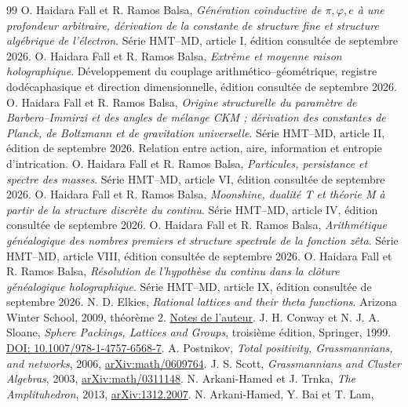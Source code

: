 \documentclass[a4paper,10pt]{article}
\theoremstyle{definition}\newtheorem{definition}[theorem]{Définition}
\theoremstyle{remark}\newtheorem{remark}[theorem]{Remarque}
\numberwithin{equation}{section}
\begin{document}
\begin{thebibliography}{99}
 O. Haidara Fall et R. Ramos Balsa,
\emph{Génération coinductive de \(\pi,\varphi,e\) à une profondeur arbitraire,
dérivation de la constante de structure fine et structure algébrique de
l’électron}. Série HMT--MD, article I, édition consultée de septembre 2026.
 O. Haidara Fall et R. Ramos Balsa,
\emph{Extrême et moyenne raison holographique}. Développement du couplage
arithmético--géométrique, registre dodécaphasique et direction dimensionnelle,
édition consultée de septembre 2026.
 O. Haidara Fall et R. Ramos Balsa,
\emph{Origine structurelle du paramètre de Barbero--Immirzi et des
angles de mélange CKM ; dérivation des constantes de Planck, de Boltzmann
et de gravitation universelle}. Série HMT--MD, article II, édition de
septembre 2026. Relation entre action, aire, information et entropie
d’intrication.
 O. Haidara Fall et R. Ramos Balsa,
\emph{Particules, persistance et spectre des masses}. Série HMT--MD, article VI,
édition consultée de septembre 2026.
 O. Haidara Fall et R. Ramos Balsa,
\emph{Moonshine, dualité T et théorie M à partir de la structure discrète du
continu}. Série HMT--MD, article IV, édition consultée de septembre 2026.
 O. Haidara Fall et R. Ramos Balsa,
\emph{Arithmétique généalogique des nombres premiers et structure spectrale
de la fonction zêta}. Série HMT--MD, article VIII, édition consultée de septembre 2026.
 O. Haidara Fall et R. Ramos Balsa,
\emph{Résolution de l’hypothèse du continu dans la clôture généalogique
holographique}. Série HMT--MD, article IX, édition consultée de septembre 2026.
 N. D. Elkies,
\emph{Rational lattices and their theta functions}. Arizona Winter School,
2009, théorème 2.
\href{https://people.math.harvard.edu/~elkies/aws09.pdf}{Notes de l’auteur}.
 J. H. Conway et N. J. A. Sloane,
\emph{Sphere Packings, Lattices and Groups}, troisième édition, Springer, 1999.
\href{https://doi.org/10.1007/978-1-4757-6568-7}{DOI: 10.1007/978-1-4757-6568-7}.
 A. Postnikov,
\emph{Total positivity, Grassmannians, and networks}, 2006,
\href{https://arxiv.org/abs/math/0609764}{arXiv:math/0609764}.
 J. S. Scott,
\emph{Grassmannians and Cluster Algebras}, 2003,
\href{https://arxiv.org/abs/math/0311148}{arXiv:math/0311148}.
 N. Arkani-Hamed et J. Trnka,
\emph{The Amplituhedron}, 2013,
\href{https://arxiv.org/abs/1312.2007}{arXiv:1312.2007}.
 N. Arkani-Hamed, Y. Bai et T. Lam,

\end{thebibliography}
\end{document}
